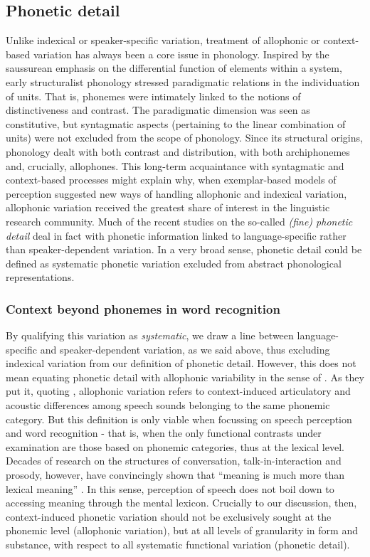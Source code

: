 \subsection{Phonetic detail}\label{sec112}
Unlike indexical or speaker-specific variation, treatment of allophonic or context-based variation has always been a core issue in phonology. Inspired by the saussurean emphasis on the differential function of elements within a system, early structuralist phonology stressed paradigmatic relations in the individuation of units. That is, phonemes were intimately linked to the notions of distinctiveness and contrast. The paradigmatic dimension was seen as constitutive, but syntagmatic aspects (pertaining to the linear combination of units) were not excluded from the scope of phonology. Since its structural origins, phonology dealt with both contrast and distribution, with both archiphonemes and, crucially, allophones. This long-term acquaintance with syntagmatic and context-based processes might explain why, when exemplar-based models of perception suggested new ways of handling allophonic and indexical variation, allophonic variation received the greatest share of interest in the linguistic research community. Much of the recent studies on the so-called \textit{(fine) phonetic detail} deal in fact with phonetic information linked to language-specific rather than speaker-dependent variation. In a very broad sense, phonetic detail could be defined as systematic phonetic variation excluded from abstract phonological representations. 

\subsubsection{Context beyond phonemes in word recognition}\label{sec1121}
By qualifying this variation as \textit{systematic}, we draw a line between language-specific and speaker-dependent variation, as we said above, thus excluding indexical variation from our definition of phonetic detail. However, this does not mean equating phonetic detail with allophonic variability in the sense of \citet{luce2003abstractness}. As they put it, quoting \citet{ladefoged2000course}, allophonic variation refers to context-induced articulatory and acoustic differences among speech sounds belonging to the same phonemic category. But this definition is only viable when focussing on speech perception and word recognition - that is, when the only functional contrasts under examination are those based on phonemic categories, thus at the lexical level. Decades of research on the structures of conversation, talk-in-interaction and prosody, however, have convincingly shown that ``meaning is much more than lexical meaning'' \citep{local2003variable}. In this sense, perception of speech does not boil down to accessing meaning through the mental lexicon. Crucially to our discussion, then, context-induced phonetic variation should not be exclusively sought at the phonemic level (allophonic variation), but at all levels of granularity in form and substance, with respect to all systematic functional variation (phonetic detail). 

